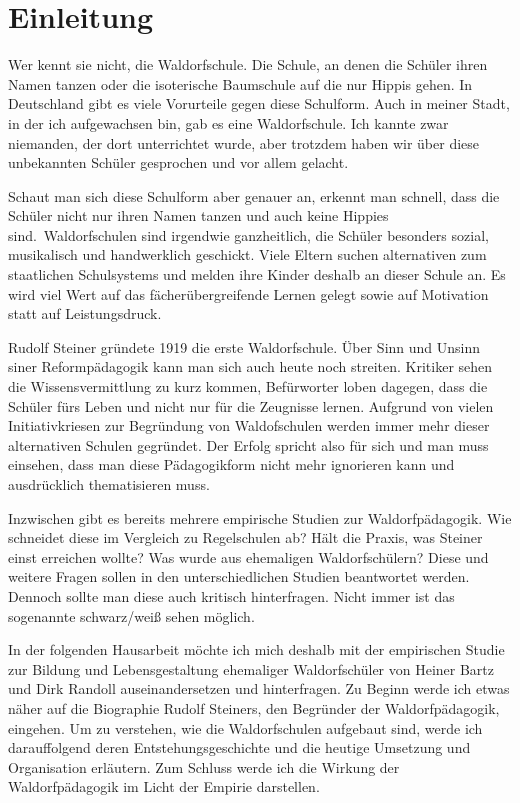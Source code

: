 \section{Einleitung}

Wer kennt sie nicht, die Waldorfschule. Die Schule, an denen die Schüler ihren Namen tanzen oder die isoterische Baumschule auf die nur Hippis gehen. In Deutschland gibt es viele Vorurteile gegen diese Schulform. Auch in meiner Stadt, in der ich aufgewachsen bin, gab es eine Waldorfschule. Ich kannte zwar niemanden, der dort unterrichtet wurde, aber trotzdem haben wir über diese unbekannten Schüler gesprochen und vor allem gelacht. 

Schaut man sich diese Schulform aber genauer an, erkennt man schnell, dass die Schüler nicht nur ihren Namen tanzen und auch keine Hippies sind. Waldorfschulen sind irgendwie ganzheitlich, die Schüler besonders sozial, musikalisch und handwerklich geschickt. Viele Eltern suchen alternativen zum staatlichen Schulsystems und melden ihre Kinder deshalb an dieser Schule an. Es wird viel Wert auf das fächerübergreifende Lernen gelegt sowie auf Motivation statt auf Leistungsdruck. 

Rudolf Steiner gründete 1919 die erste Waldorfschule. Über Sinn und Unsinn siner Reformpädagogik kann man sich auch heute noch streiten. Kritiker sehen die Wissensvermittlung zu kurz kommen, Befürworter loben dagegen, dass die Schüler fürs Leben und nicht nur für die Zeugnisse lernen. Aufgrund von vielen Initiativkriesen zur Begründung von Waldofschulen werden immer mehr dieser alternativen Schulen gegründet. Der Erfolg spricht also für sich und man muss einsehen, dass man diese Pädagogikform nicht mehr ignorieren kann und ausdrücklich thematisieren muss. 

Inzwischen gibt es bereits mehrere empirische Studien zur Waldorfpädagogik. Wie schneidet diese im Vergleich zu Regelschulen ab? Hält die Praxis, was Steiner einst erreichen wollte? Was wurde aus ehemaligen Waldorfschülern? Diese und weitere Fragen sollen in den unterschiedlichen Studien beantwortet werden. Dennoch sollte man diese auch kritisch hinterfragen. Nicht immer ist das sogenannte schwarz/weiß sehen möglich. 

In der folgenden Hausarbeit möchte ich mich deshalb mit der empirischen Studie zur Bildung und Lebensgestaltung ehemaliger Waldorfschüler von Heiner Bartz und Dirk Randoll auseinandersetzen und hinterfragen. Zu Beginn werde ich etwas näher auf die Biographie Rudolf Steiners, den Begründer der Waldorfpädagogik, eingehen. Um zu verstehen, wie die Waldorfschulen aufgebaut sind, werde ich darauffolgend deren Entstehungsgeschichte und die heutige Umsetzung und Organisation erläutern. Zum Schluss werde ich die Wirkung der Waldorfpädagogik im Licht der Empirie darstellen.